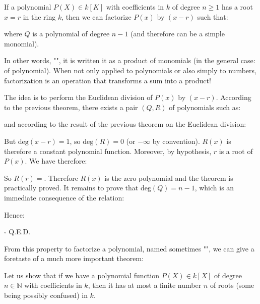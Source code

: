 	\begin{theorem}
	If a polynomial $P(X)\in k[K]$ with coefficients in $k$ of degree $n\geq 1$ has a root $x=r$ in the ring $k$, then we can factorize $P(x)$ by $(x - r)$ such that:
	
	where $Q$ is a polynomial of degree $n-1$ (and therefore can be a simple monomial).
	
	In other words, "", it is written it as a product of monomials (in the general case: of polynomial). When not only applied to polynomials or also simply to numbers, factorization is an operation that transforms a sum into a product!
	\end{theorem}
	\begin{dem}
	The idea is to perform the Euclidean division of $P(x)$ by $(x-r)$. According to the previous theorem, there exists a pair $(Q, R)$ of polynomials such as:
	
and according to the result of the previous theorem on the Euclidean division:
	
	But $\text{deg}(x-r)=1$, so $\text{deg}(R)=0$ (or $-\infty$ by convention). $R(x)$ is therefore a constant polynomial function. Moreover, by hypothesis, $r$ is a root of $P(x)$. We have therefore:
	
	So $R(r)=$. Therefore $R(x)$ is the zero polynomial and the theorem is practically proved. It remains to prove that $\text{deg}(Q)=n-1$, which is an immediate consequence of the relation:
	
	Hence:
	
	\begin{flushright}
		$\square$  Q.E.D.
	\end{flushright}
	\end{dem}
	From this property to factorize a polynomial, named sometimes "", we can give a foretaste of a much more important theorem:
	\begin{theorem}
	Let us show that if we have a polynomial  function $P(X)\in k[X]$ of degree $n\in \mathbb{N}$ with coefficients in $k$, then it has at most a finite number $n$ of roots (some being possibly confused) in $k$.
	\end{theorem}

